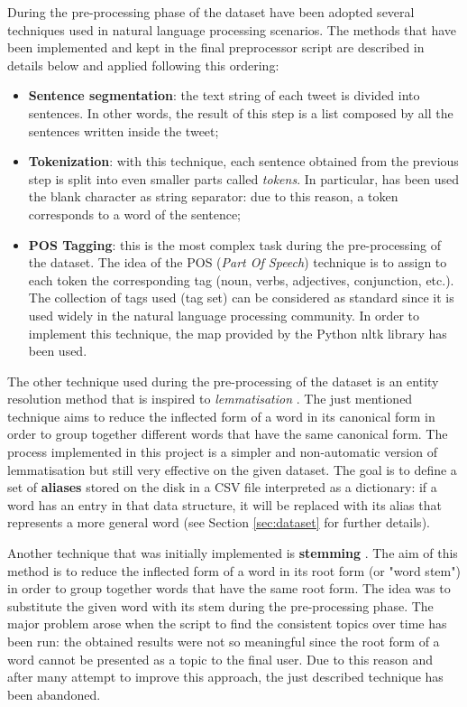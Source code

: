 During the pre-processing phase of the dataset have been adopted several techniques used in natural language processing scenarios. The methods that have been implemented and kept in the final preprocessor script are described in details below and applied following this ordering:
\begin{itemize}
	\item \textbf{Sentence segmentation}: the text string of each tweet is divided into sentences. In other words, the result of this step is a list composed by all the sentences written inside the tweet;
	\item \textbf{Tokenization}: with this technique, each sentence obtained from the previous step is split into even smaller parts called \textit{tokens}. In particular, has been used the blank character as string separator: due to this reason, a token corresponds to a word of the sentence;
	\item \textbf{POS Tagging}: this is the most complex task during the pre-processing of the dataset. The idea of the POS (\textit{Part Of Speech}) technique is to assign to each token the corresponding tag (noun, verbs, adjectives, conjunction, etc.). The collection of tags used (tag set) can be considered as standard since it is used widely in the natural language processing community. In order to implement this technique, the map provided by the Python nltk library \cite{python-nltk} has been used.
\end{itemize}
The other technique used during the pre-processing of the dataset is an entity resolution method that is inspired to \textit{lemmatisation} \cite{lemmatisation-stemming}. The just mentioned technique aims to reduce the inflected form of a word in its canonical form in order to group together different words that have the same canonical form. The process implemented in this project is a simpler and non-automatic version of lemmatisation but still very effective on the given dataset. The goal is to define a set of \textbf{aliases} stored on the disk in a CSV file interpreted as a dictionary: if a word has an entry in that data structure, it will be replaced with its alias that represents a more general word (see Section \ref{sec:dataset} for further details).

\noindent Another technique that was initially implemented is \textbf{stemming} \cite{lemmatisation-stemming}. The aim of this method is to reduce the inflected form of a word in its root form (or "word stem") in order to group together words that have the same root form. The idea was to substitute the given word with its stem during the pre-processing phase. The major problem arose when the script to find the consistent topics over time has been run: the obtained results were not so meaningful since the root form of a word cannot be presented as a topic to the final user. Due to this reason and after many attempt to improve this approach, the just described technique has been abandoned.

